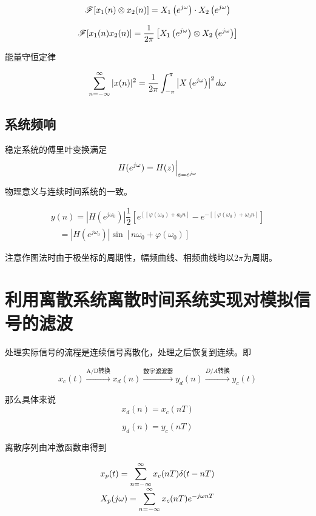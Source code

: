 \documentclass[cn,11pt,chinese,black,simple]{../elegantbook}
\begin{document}
\[
\mathscr{F}[x_{1}(n) \otimes x_{2}(n)]=X_{1}\left(e^{ j \omega}\right) \cdot X_{2}\left(e^{ j \omega}\right)
\]

\[
\mathscr{F}[x _{1}( n )  x _{2}( n )]=\dfrac{1}{2 \pi}\left[ X _{1}\left( e ^{ j \omega}\right) \otimes X _{2}\left(e^{ j \omega}\right)\right]
\]

能量守恒定律

\[\displaystyle\sum_{n=-\infty}^{\infty}| x ( n )|^{2}=\dfrac{1}{2 \pi} \int_{-\pi}^{\pi}\left| X \left( e ^{ j \omega}\right)\right|^{2} d \omega\]

\subsection{系统频响}

稳定系统的傅里叶变换满足 \[H(e^{j\omega}) = H(z)\Big|_{z=e^{j\omega}}\]

物理意义与连续时间系统的一致。

\[
    \begin{array}{l} 
        y ( n )=\left| H \left( e ^{j \omega_{0}}\right)\right| \dfrac{ 1 }{ 2 }\left[ e ^{\left[\left[\varphi\left(\omega_{0}\right)+a_{0} n\right]\right.}- e ^{-\left[\left[\varphi\left(\omega_{0}\right)+\omega_{0} n\right]\right.}\right] \\
        \quad=\left| H \left(e^{ j \omega_{0}}\right)\right| \sin \left[ n \omega_{0}+\varphi\left(\omega_{0}\right)\right]
    \end{array}\]

注意作图法时由于极坐标的周期性，幅频曲线、相频曲线均以\(2 \pi\)为周期。

\section{利用离散系统离散时间系统实现对模拟信号的滤波}

处理实际信号的流程是连续信号离散化，处理之后恢复到连续。即

\[x_c(t) \xrightarrow{\text{A/D转换}} x_d(n) \xrightarrow{\text{数字滤波器}} y_d(n) \xrightarrow{D/A转换} y_c(t)\]

那么具体来说 
\[x_d(n) = x_c(nT)\]

\[y_d(n) = y_c(nT)\]

离散序列由冲激函数串得到

\[\begin{array}{l}
    x_{p}(t)=\displaystyle\sum_{n=-\infty}^{\infty} x_{c}(n T) \delta(t-n T) \\
    X_{p}( j \omega)=\displaystyle\sum_{n=-\infty}^{\infty} x_{c}(n T) e^{- j \omega n T}
\end{array}\]
\end{document}

